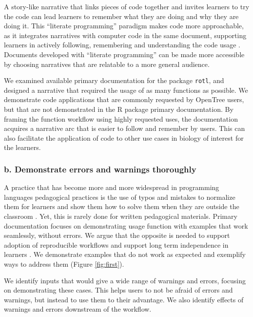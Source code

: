 \documentclass[12pt]{article}
\begin{document}
A story-like narrative that links pieces of code together and invites learners
to try the code can lead learners to remember what they are doing and
why they are doing it.
This ``literate programming'' paradigm \citep{knuth1984literate, fritzson2002mathmodelica}
makes code more approachable, as it integrates narratives with computer code in
the same document, supporting learners in actively following, remembering and understanding
the code usage \citep{piccolo2016tools}.
Documents developed with ``literate programming'' can be made more accessible by
choosing narratives that are relatable to a more general audience.

We examined available primary documentation for the package \texttt{rotl},
and designed a narrative that required the usage of as many functions as possible.
We demonstrate code applications that are commonly requested by OpenTree users,
but that are not demonstrated in the R package primary documentation.
By framing the function workflow using highly requested uses, the documentation acquires a
narrative arc that is easier to follow and remember by users. This can also facilitate the application
of code to other use cases in biology of interest for the learners.


\subsubsection*{b. Demonstrate errors and warnings thoroughly}

A practice that has become more and more widespread in programming languages pedagogical practices
is the use of typos and mistakes to normalize them for learners and show them how
to solve them when they are outside the classroom \citep{shannon2015live}.
Yet, this is rarely done for written pedagogical materials.
Primary documentation focuses on demonstrating usage function with examples that
work seamlessly, without errors. We argue that the opposite is needed to support
adoption of reproducible workflows and support long term independence in learners
\citep{gaspar2007restoring}.
We demonstrate examples that do not work
as expected and exemplify ways to address them (Figure \ref{fig:first}).

We identify inputs that would give
a wide range of warnings and errors, focusing on demonstrating these cases. This
helps users to not be afraid of errors and warnings, but instead to use them to
their advantage.
We also identify effects of warnings and errors downstream of the workflow.
\end{document}
